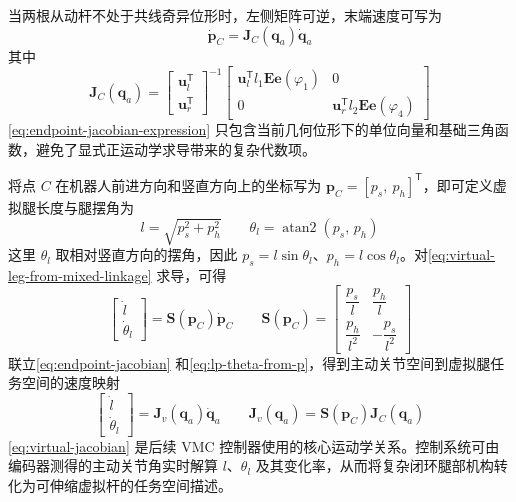 当两根从动杆不处于共线奇异位形时，左侧矩阵可逆，末端速度可写为
\begin{equation}
  \dot{\boldsymbol{p}}_C
  =
  \boldsymbol{J}_C(\boldsymbol{q}_a)\dot{\boldsymbol{q}}_a
  \label{eq:endpoint-jacobian}
\end{equation}
其中
\begin{equation}
  \boldsymbol{J}_C(\boldsymbol{q}_a)
  =
  \begin{bmatrix}
    \boldsymbol{u}_l^\mathsf{T} \\
    \boldsymbol{u}_r^\mathsf{T}
  \end{bmatrix}^{-1}
  \begin{bmatrix}
    \boldsymbol{u}_l^\mathsf{T} l_1\boldsymbol{E}\boldsymbol{e}(\varphi_1) & 0 \\
    0 & \boldsymbol{u}_r^\mathsf{T} l_2\boldsymbol{E}\boldsymbol{e}(\varphi_4)
  \end{bmatrix}
  \label{eq:endpoint-jacobian-expression}
\end{equation}
\eqref{eq:endpoint-jacobian-expression} 只包含当前几何位形下的单位向量和基础三角函数，避免了显式正运动学求导带来的复杂代数项。

将点 $C$ 在机器人前进方向和竖直方向上的坐标写为 $\boldsymbol{p}_C=[p_s,\ p_h]^\mathsf{T}$，即可定义虚拟腿长度与腿摆角为
\begin{equation}
  l = \sqrt{p_s^2+p_h^2}
  \qquad
  \theta_l = \operatorname{atan2}(p_s,\,p_h)
  \label{eq:virtual-leg-from-mixed-linkage}
\end{equation}
这里 $\theta_l$ 取相对竖直方向的摆角，因此 $p_s=l\sin\theta_l$、$p_h=l\cos\theta_l$。对\eqref{eq:virtual-leg-from-mixed-linkage} 求导，可得
\begin{equation}
  \begin{bmatrix}
    \dot{l} \\
    \dot{\theta}_l
  \end{bmatrix}
  =
  \boldsymbol{S}(\boldsymbol{p}_C)\dot{\boldsymbol{p}}_C
  \qquad
  \boldsymbol{S}(\boldsymbol{p}_C)
  =
  \begin{bmatrix}
    \dfrac{p_s}{l} & \dfrac{p_h}{l} \\
    \dfrac{p_h}{l^2} & -\dfrac{p_s}{l^2}
  \end{bmatrix}
  \label{eq:lp-theta-from-p}
\end{equation}
联立\eqref{eq:endpoint-jacobian} 和\eqref{eq:lp-theta-from-p}，得到主动关节空间到虚拟腿任务空间的速度映射
\begin{equation}
  \begin{bmatrix}
    \dot{l} \\
    \dot{\theta}_l
  \end{bmatrix}
  =
  \boldsymbol{J}_v(\boldsymbol{q}_a)\dot{\boldsymbol{q}}_a
  \qquad
  \boldsymbol{J}_v(\boldsymbol{q}_a)
  =
  \boldsymbol{S}(\boldsymbol{p}_C)\boldsymbol{J}_C(\boldsymbol{q}_a)
  \label{eq:virtual-jacobian}
\end{equation}
\eqref{eq:virtual-jacobian} 是后续 VMC 控制器使用的核心运动学关系。控制系统可由编码器测得的主动关节角实时解算 $l$、$\theta_l$ 及其变化率，从而将复杂闭环腿部机构转化为可伸缩虚拟杆的任务空间描述。

